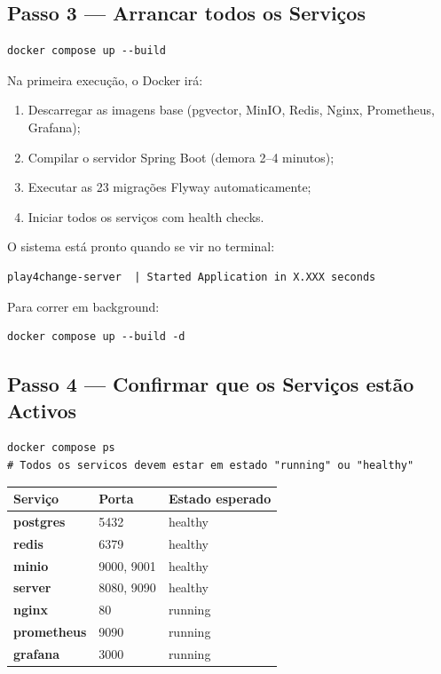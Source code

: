 \documentclass[12pt,a4paper]{article}
\newcommand{\service}[1]{\textbf{\textsf{#1}}}
\begin{document}
\subsection{Passo 3 — Arrancar todos os Serviços}

\begin{lstlisting}[style=bash]
docker compose up --build
\end{lstlisting}

Na primeira execução, o Docker irá:
\begin{enumerate}
  \item Descarregar as imagens base (pgvector, MinIO, Redis, Nginx, Prometheus, Grafana);
  \item Compilar o servidor Spring Boot (demora 2--4 minutos);
  \item Executar as 23 migrações Flyway automaticamente;
  \item Iniciar todos os serviços com health checks.
\end{enumerate}

O sistema está pronto quando se vir no terminal:

\begin{lstlisting}
play4change-server  | Started Application in X.XXX seconds
\end{lstlisting}

Para correr em background:
\begin{lstlisting}[style=bash]
docker compose up --build -d
\end{lstlisting}

\subsection{Passo 4 — Confirmar que os Serviços estão Activos}

\begin{lstlisting}[style=bash]
docker compose ps
# Todos os servicos devem estar em estado "running" ou "healthy"
\end{lstlisting}

\begin{center}
\begin{tabular}{lll}
\toprule
\textbf{Serviço} & \textbf{Porta} & \textbf{Estado esperado} \\
\midrule
\service{postgres}   & 5432 & healthy \\
\service{redis}      & 6379 & healthy \\
\service{minio}      & 9000, 9001 & healthy \\
\service{server}     & 8080, 9090 & healthy \\
\service{nginx}      & 80 & running \\
\service{prometheus} & 9090 & running \\
\service{grafana}    & 3000 & running \\
\bottomrule
\end{tabular}
\end{center}
\end{document}
